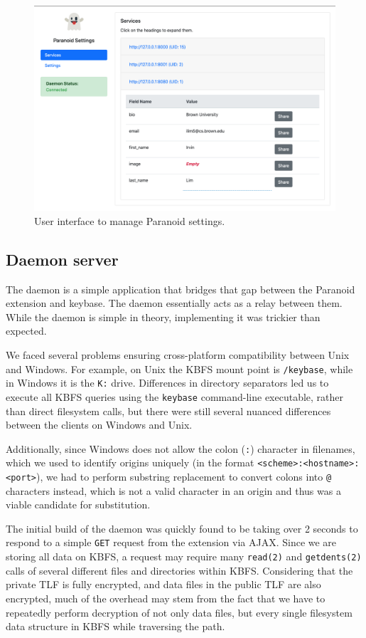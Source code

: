 \documentclass[letterpaper,twocolumn,10pt]{article}
\begin{document}
\begin{figure}[]
    \centering
    \includegraphics[width=\columnwidth]{png/settings.png}
    \caption{User interface to manage Paranoid settings.}
    \label{fig:settings}
\end{figure}

\subsection{Daemon server}

The daemon is a simple application that bridges that gap between the Paranoid extension and keybase. The daemon essentially acts as a relay between them. While the daemon is simple in theory, implementing it was trickier than expected.

We faced several problems ensuring cross-platform compatibility between Unix and Windows. For example, on Unix the KBFS mount point is \texttt{/keybase}, while in Windows it is the \texttt{K:} drive. Differences in directory separators led us to execute all KBFS queries using the \texttt{keybase} command-line executable, rather than direct filesystem calls, but there were still several nuanced differences between the clients on Windows and Unix.

Additionally, since Windows does not allow the colon (\texttt{:}) character in filenames, which we used to identify origins uniquely (in the format \texttt{<scheme>:<hostname>:<port>}), we had to perform substring replacement to convert colons into \texttt{@} characters instead, which is not a valid character in an origin and thus was a viable candidate for substitution.

The initial build of the daemon was quickly found to be taking over 2 seconds to respond to a simple \texttt{GET} request from the extension via AJAX. Since we are storing all data on KBFS, a request may require many \texttt{read(2)} and \texttt{getdents(2)} calls of several different files and directories within KBFS. Considering that the private TLF is fully encrypted, and data files in the public TLF are also encrypted, much of the overhead may stem from the fact that we have to repeatedly perform decryption of not only data files, but every single filesystem data structure in KBFS while traversing the path.
\end{document}
